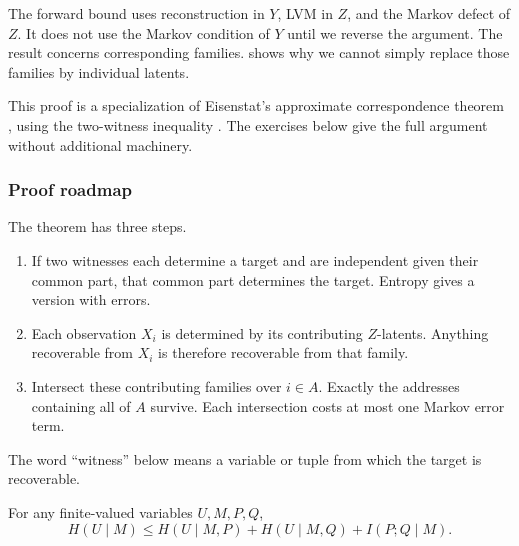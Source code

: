 \documentclass[11pt]{article}
\begin{document}
The forward bound uses reconstruction in $Y$, LVM in $Z$, and the Markov
defect of $Z$.
It does not use the Markov condition of $Y$ until we reverse the argument.
The result concerns corresponding families.  shows why we cannot simply
replace those families by individual latents.

This proof is a specialization of Eisenstat's approximate correspondence
theorem \citep[Theorem~6.8]{eisenstat2025condensation}, using the two-witness
inequality \citep[Lemma~6.4]{eisenstat2025condensation}.
The exercises below give the full argument without additional machinery.

\subsubsection{Proof roadmap}
The theorem has three steps.
\begin{enumerate}
\item If two witnesses each determine a target and are independent given their
common part, that common part determines the target. Entropy gives a version
with errors.
\item Each observation $X_i$ is determined by its contributing $Z$-latents.
Anything recoverable from $X_i$ is therefore recoverable from that family.
\item Intersect these contributing families over $i\in A$. Exactly the
addresses containing all of $A$ survive. Each intersection costs at most one
Markov error term.
\end{enumerate}
The word ``witness'' below means a variable or tuple from which the target is
recoverable.

\begin{lemma}
\label{lem:witness}
For any finite-valued variables $U,M,P,Q$,
\begin{equation}
 H(U\mid M)\le H(U\mid M,P)+H(U\mid M,Q)+I(P;Q\mid M).
 \label{eq:witness}
\end{equation}
\end{lemma}
\end{document}

